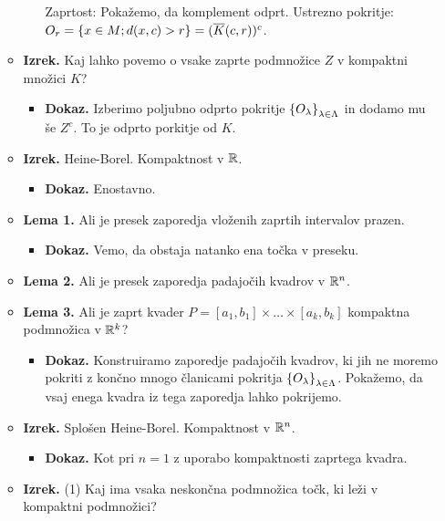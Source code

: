 \begin{enumerate}
\begin{itemize}
\begin{itemize}
            Zaprtost: Pokažemo, da komplement odprt. Ustrezno pokritje: $O_r = \left\{x \in M; d(x, c) > r\right\} = (\overline{K}(c,r))^c$.
        \end{itemize}
        \item \colorbox{blue!30}{\textbf{Izrek.}} Kaj lahko povemo o vsake zaprte podmnožice $Z$ v kompaktni množici $K$?
        \begin{itemize}
            \item \colorbox{green!30}{\textbf{Dokaz.}} Izberimo poljubno odprto pokritje $\left\{O_\lambda\right\}_{\lambda \in \Lambda}$ in dodamo mu še $Z^c$. To je odprto porkitje od $K$. 
        \end{itemize}
        \item \colorbox{blue!30}{\textbf{Izrek.}} Heine-Borel. Kompaktnost v $\mathbb{R}$.
        \begin{itemize}
            \item \colorbox{green!30}{\textbf{Dokaz.}} Enostavno.
        \end{itemize}
        \item \colorbox{blue!30}{\textbf{Lema 1.}} Ali je presek zaporedja vloženih zaprtih intervalov prazen.
        \begin{itemize}
            \item \colorbox{green!30}{\textbf{Dokaz.}} Vemo, da obstaja natanko ena točka v preseku.
        \end{itemize}
        \item \colorbox{blue!30}{\textbf{Lema 2.}} Ali je presek zaporedja padajočih kvadrov v $\mathbb{R}^n$.
        \item \colorbox{blue!30}{\textbf{Lema 3.}} Ali je zaprt kvader $P = [a_1, b_1] \times \ldots \times [a_k, b_k]$ kompaktna podmnožica v $\mathbb{R}^k$?
        \begin{itemize}
            \item \colorbox{green!30}{\textbf{Dokaz.}} Konstruiramo zaporedje padajočih kvadrov, ki jih ne moremo pokriti z končno mnogo članicami pokritja $\left\{O_\lambda\right\}_{\lambda \in \Lambda}$. Pokažemo, da vsaj enega kvadra iz tega zaporedja lahko pokrijemo.
        \end{itemize}
        \item \colorbox{blue!30}{\textbf{Izrek.}} Splošen Heine-Borel. Kompaktnost v $\mathbb{R}^n$.
        \begin{itemize}
            \item \colorbox{green!30}{\textbf{Dokaz.}} Kot pri $n=1$ z uporabo kompaktnosti zaprtega kvadra.
        \end{itemize}
        \item \colorbox{blue!30}{\textbf{Izrek.}} (1) Kaj ima vsaka neskončna podmnožica točk, ki leži v kompaktni podmnožici?
        

\end{itemize}
\end{enumerate}
